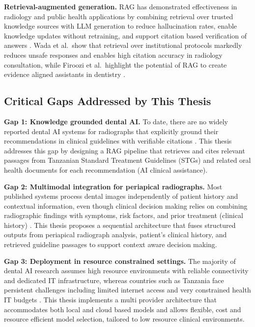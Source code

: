 \documentclass[12pt,a4paper]{report}
\begin{document}
	\textbf{Retrieval-augmented generation.}
	RAG has demonstrated effectiveness in radiology and public health applications
	by combining retrieval over trusted knowledge sources with LLM generation to
	reduce hallucination rates, enable knowledge updates without retraining, and
	support citation based verification of answers
	\cite{lewis2020retrieval,Wada2025RAGRadiology,xu2025mega_rag}. Wada et al.\
	show that retrieval over institutional protocols markedly reduces unsafe
	responses and enables high citation accuracy in radiology consultation, while
	Firoozi et al.\ highlight the potential of RAG to create evidence aligned
	assistants in dentistry \cite{Wada2025RAGRadiology,firoozi2025rag_dentistry}.
	
	\subsection{Critical Gaps Addressed by This Thesis}
	
	\textbf{Gap 1: Knowledge grounded dental AI.}
	To date, there are no widely reported dental AI systems for radiographs that
	explicitly ground their recommendations in clinical guidelines with verifiable
	citations \cite{putra2021ai_dental_radiography,inchingolo2025ai_dentistry_review}.
	This thesis addresses this gap by designing a RAG pipeline that retrieves and
	cites relevant passages from Tanzanian Standard Treatment Guidelines (STGs) and
	related oral health documents for each recommendation (AI clinical assistance).
	
	\textbf{Gap 2: Multimodal integration for periapical radiographs.}
	Most published systems process dental images independently of patient history
	and contextual information, even though clinical decision making relies on
	combining radiographic findings with symptoms, risk factors, and prior
	treatment (clinical history) \cite{putra2021ai_dental_radiography,inchingolo2025ai_dentistry_review}.
	This thesis proposes a sequential architecture that fuses structured outputs
	from periapical radiograph analysis, patient's clinical history, and retrieved guideline
	passages to support context aware decision making.
	
	\textbf{Gap 3: Deployment in resource constrained settings.}
	The majority of dental AI research assumes high resource environments with
	reliable connectivity and dedicated IT infrastructure, whereas countries such
	as Tanzania face persistent challenges including limited internet access and
	very constrained health IT budgets \cite{Edward2024OralHealthTZ,tanzania_oral_health_policy}.
	This thesis implements a multi provider architecture that accommodates both local and cloud based models and allows flexible, cost  and resource efficient model selection, tailored
	to low resource clinical environments.
	
\end{document}
